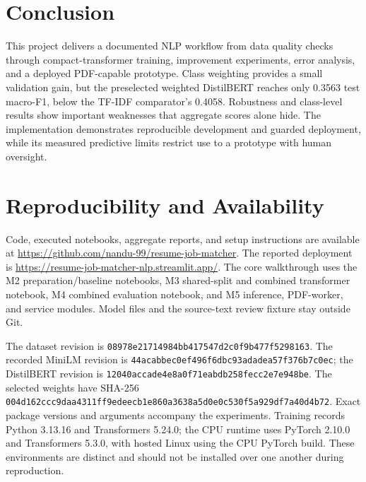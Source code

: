 \documentclass[conference,a4paper]{IEEEtran}
\begin{document}
\section{Conclusion}
This project delivers a documented NLP workflow from data quality checks through compact-transformer training, improvement experiments, error analysis, and a deployed PDF-capable prototype. Class weighting provides a small validation gain, but the preselected weighted DistilBERT reaches only 0.3563 test macro-F1, below the TF-IDF comparator's 0.4058. Robustness and class-level results show important weaknesses that aggregate scores alone hide. The implementation demonstrates reproducible development and guarded deployment, while its measured predictive limits restrict use to a prototype with human oversight.

\section*{Reproducibility and Availability}
Code, executed notebooks, aggregate reports, and setup instructions are available at \url{https://github.com/nandu-99/resume-job-matcher}. The reported deployment is \url{https://resume-job-matcher-nlp.streamlit.app/}. The core walkthrough uses the M2 preparation/baseline notebooks, M3 shared-split and combined transformer notebook, M4 combined evaluation notebook, and M5 inference, PDF-worker, and service modules. Model files and the source-text review fixture stay outside Git.

The dataset revision is \nolinkurl{08978e21714984bb417547d2c0f9b477f5298163}. The recorded MiniLM revision is \nolinkurl{44acabbec0ef496f6dbc93adadea57f376b7c0ec}; the DistilBERT revision is \nolinkurl{12040accade4e8a0f71eabdb258fecc2e7e948be}. The selected weights have SHA-256 \nolinkurl{004d162ccc9daa4311ff9edeecb1e860a3638a5d0e0c530f5a929df7a40d4b72}. Exact package versions and arguments accompany the experiments. Training records Python 3.13.16 and Transformers 5.24.0; the CPU runtime uses PyTorch 2.10.0 and Transformers 5.3.0, with hosted Linux using the CPU PyTorch build. These environments are distinct and should not be installed over one another during reproduction.
\end{document}
